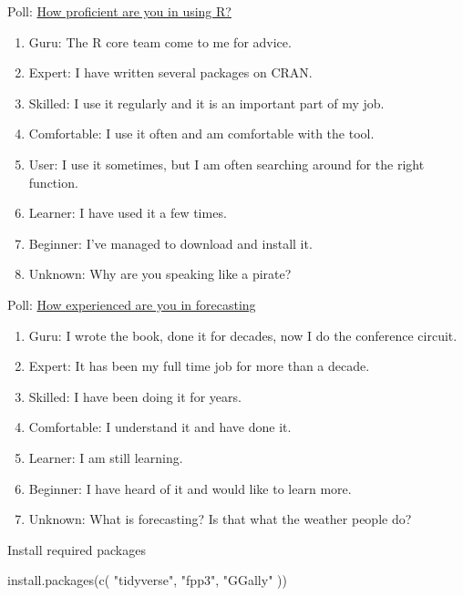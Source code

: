 \documentclass[
  14pt,
  ignorenonframetext,
  aspectratio=169,
]{beamer}
\newenvironment{Shaded}{\begin{snugshade}}{\end{snugshade}}
\newcommand{\FunctionTok}[1]{\textcolor[rgb]{0.00,0.00,0.00}{#1}}
\newcommand{\NormalTok}[1]{\textcolor[rgb]{0.00,0.00,0.00}{#1}}
\newcommand{\StringTok}[1]{\textcolor[rgb]{0.31,0.60,0.02}{#1}}
\providecommand{\tightlist}{%
  \setlength{\itemsep}{0pt}\setlength{\parskip}{0pt}}\usepackage{longtable,booktabs,array}
\renewenvironment{Shaded}{\vspace*{0.15cm}\color{black}\fontsize{10}{10}\sf\begin{snugshade}\color{black}}{\end{snugshade}}
\begin{document}
\begin{frame}{Poll: \href{https://www.menti.com/alfmobtvo9wb}{How
proficient are you in using R?}}
\protect\hypertarget{poll-how-proficient-are-you-in-using-r}{}
\fontsize{14}{15}\sf

\begin{enumerate}
\tightlist
\item
  Guru: The R core team come to me for advice.
\item
  Expert: I have written several packages on CRAN.
\item
  Skilled: I use it regularly and it is an important part of my job.
\item
  Comfortable: I use it often and am comfortable with the tool.
\item
  User: I use it sometimes, but I am often searching around for the
  right function.
\item
  Learner: I have used it a few times.
\item
  Beginner: I've managed to download and install it.
\item
  Unknown: Why are you speaking like a pirate?
\end{enumerate}
\end{frame}

\begin{frame}{Poll: \href{https://www.menti.com/alfmobtvo9wb}{How
experienced are you in forecasting}}
\protect\hypertarget{poll-how-experienced-are-you-in-forecasting}{}
\begin{enumerate}
\tightlist
\item
  Guru: I wrote the book, done it for decades, now I do the conference
  circuit.
\item
  Expert: It has been my full time job for more than a decade.
\item
  Skilled: I have been doing it for years.
\item
  Comfortable: I understand it and have done it.
\item
  Learner: I am still learning.
\item
  Beginner: I have heard of it and would like to learn more.
\item
  Unknown: What is forecasting? Is that what the weather people do?
\end{enumerate}
\end{frame}

\begin{frame}[fragile]{Install required packages}
\protect\hypertarget{install-required-packages}{}
\begin{Shaded}
\begin{Highlighting}[]
\FunctionTok{install.packages}\NormalTok{(}\FunctionTok{c}\NormalTok{(}
  \StringTok{"tidyverse"}\NormalTok{,}
  \StringTok{"fpp3"}\NormalTok{,}
  \StringTok{"GGally"}
\NormalTok{))}
\end{Highlighting}
\end{Shaded}
\end{frame}
\end{document}
